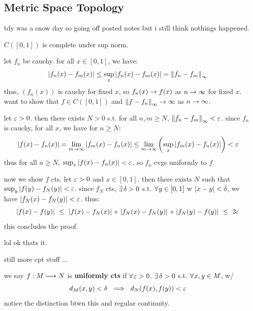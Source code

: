 \subsection{Metric Space Topology}

tdy was a snow day so going off posted notes but i still think
nothings happened.

\begin{xmp}[source=Primary Source Material]
    $C([0,1])$ is complete under sup norm.

	let $f_{n}$ be cauchy. for all $x\in[0,1]$, we have:
	\begin{equation*}
	    \abs{f_{n}(x)-f_{m}(x)}\leq\sup_{x}\abs{f_{n}(x)-f_{m}(x)}
		=\left\|f_{n}-f_{m}\right\|_{\infty}
	\end{equation*}
	thus, $(f_{n}(x))$ is cauchy for fixed $x$, so $f_{n}(x)\rightarrow f(x)$ as
	$n\rightarrow\infty$ for fixed $x$.
	want to show that $f\in C([0,1])$ and $\left\|f-f_{n}\right\|_{\infty}\rightarrow\infty$
	as $n\rightarrow\infty$.

	let $\varepsilon>0$. then there exists $N>0$ s.t. for all $n,m\geq N$,
	$\left\|f_{n}-f_{m}\right\|_{\infty}<\varepsilon$.
	since $f_{n}$ is cauchy, for all $x$, we have for $n\geq N$:
	\begin{equation*}
		\abs{f(x)-f_{n}(x)}=\lim_{m\rightarrow\infty}\abs{f_{m}(x)-f_{n}(x)} \leq
		\lim_{m\rightarrow\infty}\left(\sup_{x}\abs{f_{m}(x)-f_{n}(x)}\right) <\varepsilon
	\end{equation*}
	thus for all $n\geq N$, $\sup_{x}\abs{f(x)-f_{n}(x)}<\varepsilon$, so
	$f_{n}$ cvgs uniformly to $f$.

	now we show $f$ cts. let $\varepsilon>0$ and $x\in[0,1]$.
	then there exists $N$ such that \\
	$\sup_{y}\abs{f(y)-f_{N}(y)}<\varepsilon$.
	since $f_{N}$ cts, $\ex\delta>0$ s.t. $\fa y\in[0,1]$ w $\abs{x-y}<\delta$,
	we have $\abs{f_{N}(x)-f_{N}(y)}<\varepsilon$. thus:
	\begin{equation*}
	    \abs{f(x)-f(y)} \ \leq \
		\abs{f(x)-f_{N}(x)}+\abs{f_{N}(x)-f_{N}(y)}+\abs{f_{N}(y)-f(y)}
		\ \leq \ 3\varepsilon
	\end{equation*}
	this concludes the proof.
\end{xmp}

lol ok thats it.


still more cpt stuff ...

\begin{defn}
    we say $f:M\longrightarrow N$ is \textbf{uniformly cts} if $\fa\ep>0$,
	$\ex\delta>0$ s.t. $\fa x,y\in M$, w/
	\begin{equation*}
	    d_{M}(x,y)<\delta \ \implies \ d_{N}(f(x),f(y))<\ep
	\end{equation*}
	notice the distinction btwn this and regular continuity.
\end{defn} \

